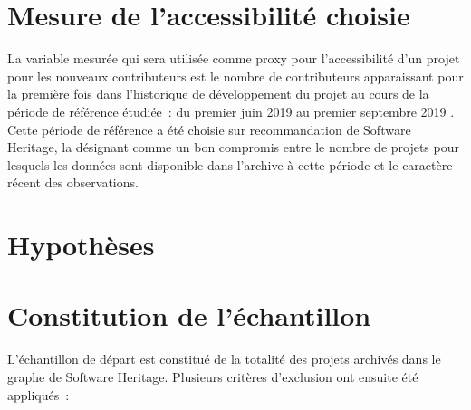 \section{Mesure de l'accessibilité choisie}

La variable mesurée qui sera utilisée comme proxy pour l'accessibilité d'un projet pour les nouveaux
contributeurs est le nombre de contributeurs apparaissant pour la première fois dans l'historique de
développement du projet au cours de la période de référence étudiée : du premier juin 2019 au premier
septembre 2019 \parencite[voir section \ref{sec:accessibility-measure}, ainsi que][p.~13,16]{signals-2019}.
Cette période de référence a été choisie sur recommandation de Software Heritage, la désignant comme un bon
compromis entre le nombre de projets pour lesquels les données sont disponible dans l'archive à cette période
et le caractère récent des observations.

\pagebreak[4]

\section{Hypothèses}




\section{Constitution de l'échantillon}
\label{sec:constitution_echantillon}

L'échantillon de départ est constitué de la totalité des projets archivés dans le graphe de Software Heritage.
Plusieurs critères d'exclusion ont ensuite été appliqués :

